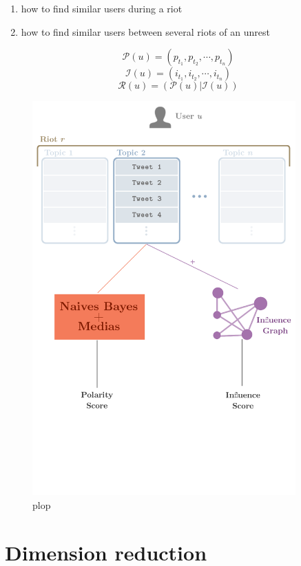 \documentclass[a4paper,twoside,12pt,openright]{report}
\begin{document}
\begin{enumerate}
\item how to find similar users during a riot
\item how to find similar users between several riots of an unrest
\end{enumerate}

$$ \mathcal{P}(u) = (p_{t_1},p_{t_2},\cdots,p_{t_n}) $$
$$ \mathcal{I}(u) = (i_{t_1},i_{t_2},\cdots,i_{t_n}) $$
$$ \mathcal{R}(u) = (\mathcal{P}(u) | \mathcal{I}(u)) $$


\newpage

\begin{figure}[H]
\centering
\includegraphics[width=0.9\textwidth]{images/diags/chain.png}
\caption{plop}
\end{figure}

\newpage

\section{Dimension reduction}
\label{dimReducSection}
\end{document}
